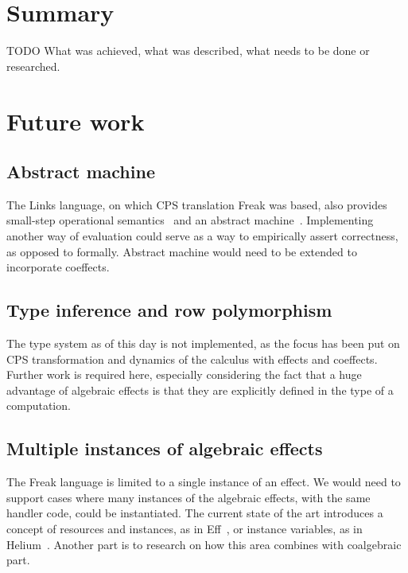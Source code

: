 \documentclass[declaration,shortabstract]{iithesis}
\theoremstyle{definition} \newtheorem{definition}{Definition}[chapter]
\theoremstyle{remark} \newtheorem{remark}[definition]{Observation}
\theoremstyle{plain} \newtheorem{theorem}[definition]{Theorem}
\theoremstyle{plain} \newtheorem{lemma}[definition]{Lemma}
\begin{document}
\section{Summary}

    TODO What was achieved, what was described, what needs to be done or researched.

\section{Future work}

    \subsection{Abstract machine}

    The Links language, on which CPS translation Freak was based, also provides
    small-step operational semantics~\cite{handlers-cps} and an abstract
    machine~\cite{liberating-effects}. Implementing another way of evaluation
    could serve as a way to empirically assert correctness, as opposed to formally.
    Abstract machine would need to be extended to incorporate coeffects.

    \subsection{Type inference and row polymorphism}

    The type system as of this day is not implemented, as the focus has been put
    on CPS transformation and dynamics of the calculus with effects and coeffects.
    Further work is required here, especially considering the fact that a huge
    advantage of algebraic effects is that they are explicitly defined in the
    type of a computation.

    \subsection{Multiple instances of algebraic effects}

    The Freak language is limited to a single instance of an effect. We would
    need to support cases where many instances of the algebraic effects, with
    the same handler code, could be instantiated. The current state of the
    art introduces a concept of resources and instances, as in Eff~\cite{programming-in-eff},
    or instance variables, as in Helium~\cite{binders-labels}. Another part is
    to research on how this area combines with coalgebraic part.
\end{document}
